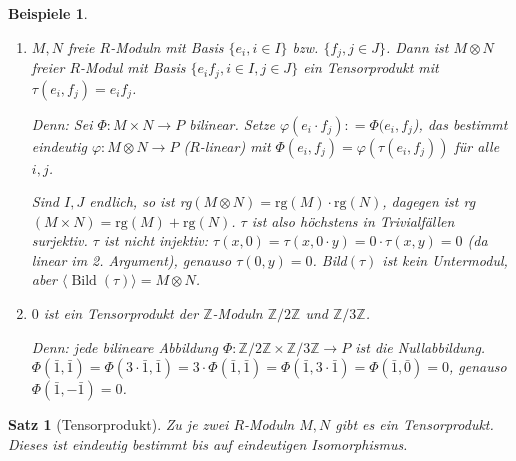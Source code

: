 \documentclass[a4paper,12pt]{scrbook}
\theoremstyle{break}
\newtheorem{Satz}{Satz}
\theoremstyle{nonumberbreak}
\newtheorem{nnBsp}{Beispiele}
\theoremstyle{nonumberplain}
\newcommand{\defeqr}[0]{\mathrel{\mathop:}=}
\DeclareMathOperator{\Bild}{Bild}
\begin{document}
\begin{nnBsp}
  \begin{enumerate}
    \item[1.)] $M, N$ freie $R$-Moduln mit Basis $\{e_i, i \in I\}$ bzw. $\{f_j, j
               \in J\}$. Dann ist $M \otimes N$ freier $R$-Modul mit Basis
               $\{e_i f_j, i \in I, j \in J\}$ ein Tensorprodukt mit
               $\tau(e_i,f_j) = e_i f_j$.

               Denn: Sei $\Phi: M \times N \to P$ bilinear. Setze
               $\varphi(e_i \cdot f_j) \defeqr \Phi(e_i,f_j$), das bestimmt eindeutig
               $\varphi: M \otimes N \to P$ ($R$-linear) mit $\Phi(e_i,f_j) =
               \varphi(\tau(e_i,f_j))$ für alle $i,j$.

               Sind $I, J$ endlich, so ist rg$(M \otimes N) = \mbox{rg}(M) \cdot
               \mbox{rg}(N)$, dagegen ist rg$(M \times N) = \mbox{rg}(M) +
               \mbox{rg}(N)$. $\tau$ ist also höchstens in Trivialfällen
               surjektiv. $\tau$ ist nicht injektiv: $\tau(x,0) = \tau(x,0 \cdot
               y) = 0 \cdot \tau(x,y) = 0$ (da linear im 2. Argument), genauso
               $\tau(0,y) = 0$. Bild$(\tau)$ ist kein Untermodul, aber $\langle
               \Bild(\tau) \rangle = M \otimes N$.

    \item[2.)] $0$ ist ein Tensorprodukt der $\mathbb{Z}$-Moduln
               $\mathbb{Z}/2\mathbb{Z}$ und $\mathbb{Z}/3\mathbb{Z}$.

               Denn: jede bilineare Abbildung $\Phi: \mathbb{Z}/2\mathbb{Z}
               \times \mathbb{Z}/3\mathbb{Z} \to P$ ist die Nullabbildung.
               $\Phi(\bar{1},\bar{1}) = \Phi(3 \cdot \bar{1},\bar{1}) = 3 \cdot
               \Phi(\bar{1},\bar{1}) = \Phi(\bar{1},3 \cdot \bar{1}) =
               \Phi(\bar{1},\bar{0})= 0$, genauso $\Phi(\bar{1},-\bar{1}) = 0$.
  \end{enumerate}
\end{nnBsp}

\begin{Satz}[Tensorprodukt]
  Zu je zwei $R$-Moduln $M,N$ gibt es ein Tensorprodukt. Dieses ist eindeutig
  bestimmt bis auf eindeutigen Isomorphismus.
\end{Satz}
\end{document}
